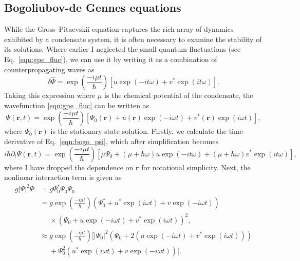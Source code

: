 \subsection{Bogoliubov-de Gennes equations}
\label{sec:bogo}
While the Gross--Pitaevskii equation captures the rich array of dynamics exhibited by a condensate system, it is often necessary to examine the stability of its solutions. Where earlier I neglected the small quantum fluctuations (see Eq.~\eqref{eqn:gpe_fluc}), we can use it by writing it as a combination of counterpropagating waves as
\begin{equation}
    \delta\hat{\Psi} = \exp\left(\frac{-i\mu t}{\hbar}\right)[u\exp(-it\omega) + v^{*}\exp(it\omega)].
\end{equation}
Taking this expression where $\mu$ is the chemical potential of the condensate, the wavefunction \eqref{eqn:gpe_fluc} can be written as
\begin{equation}\label{eqn:bogo_psi}
\Psi(\mathbf{r},t) = \exp\left(\frac{-i\mu t}{\hbar}\right)[\Psi_0(\mathbf{r}) + u(\mathbf{r})\exp\left(-i\omega t\right) + v^{*}(\mathbf{r})\exp\left(i\omega t\right) ],
\end{equation}
where $\Psi_0(\mathbf{r})$ is the stationary state solution. Firstly, we calculate the time-derivative of Eq.~\eqref{eqn:bogo_psi}, which after simplification becomes
\begin{equation}\label{eqn:bogo_lhs}
    i\hbar\partial_t \Psi(\mathbf{r},t) = \exp\left(\frac{-i\mu t}{\hbar}\right)\left[\mu\Psi_0 + (\mu+\hbar\omega)u\exp\left(-it\omega\right) + (\mu+\hbar\omega)v^{*}\exp\left(it\omega\right) \right],
\end{equation}
where I have dropped the dependence on $\mathbf{r}$ for notational simplicity. Next, the nonlinear interaction term is given as
\begin{subequations}
\begin{align}\label{eqn:bogo_nonlin}
    g|\Psi|^2\Psi &= g\Psi_0^{*}\Psi_0\Psi_0 \\
    &= g\exp\left(\frac{-i\mu t}{\hbar}\right)(\Psi_0^{*} + u^{*}\exp(i\omega t) + v\exp(-i\omega t))\\ &~~~~~~\times (\Psi_0 + u\exp(-i\omega t) + v^{*}\exp(i\omega t))^2, \nonumber \\
    & \approx g\exp\left(\frac{-i\mu t}{\hbar}\right)[|\Psi_0|^2(\Psi_0 + 2(u\exp(-i\omega t) + v^{*}\exp(i\omega t) )) \\ &~~~~~~+ \Psi_0^2( u^{*}\exp(i\omega t) + v\exp(-i\omega t))]. \nonumber
\end{align}
\end{subequations}
